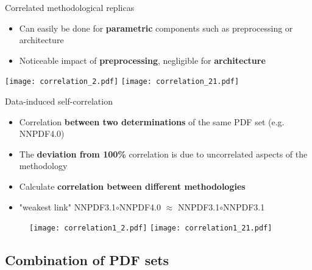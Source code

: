 \begin{frame}[t]{Correlated methodological replicas}
  \begin{itemize}
    \item Can easily be done for {\bf parametric} components such as preprocessing or architecture
    \item Noticeable impact of {\bf preprocessing}, negligible for {\bf architecture}
  \end{itemize}

  \texttt{[image: correlation\_2.pdf]}
  \texttt{[image: correlation\_21.pdf]}

  \noindent{}
\end{frame}

\begin{frame}[t]{Data-induced self-correlation}
  \begin{itemize}
    \item Correlation {\bf between two determinations} of the same PDF set (e.g. NNPDF4.0)
    \item The {\bf deviation from 100\%} correlation is due to uncorrelated aspects of the methodology
    \item<2> Calculate {\bf correlation between different methodologies}
    \item<2> "weakest link" NNPDF3.1$\circ$NNPDF4.0 $\approx$ NNPDF3.1$\circ$NNPDF3.1
  \end{itemize}
  \begin{figure}
    \centering
    \texttt{[image: correlation1\_2.pdf]}
    \texttt{[image: correlation1\_21.pdf]}
  \end{figure}

\end{frame}


\subsection{Combination of PDF sets}


